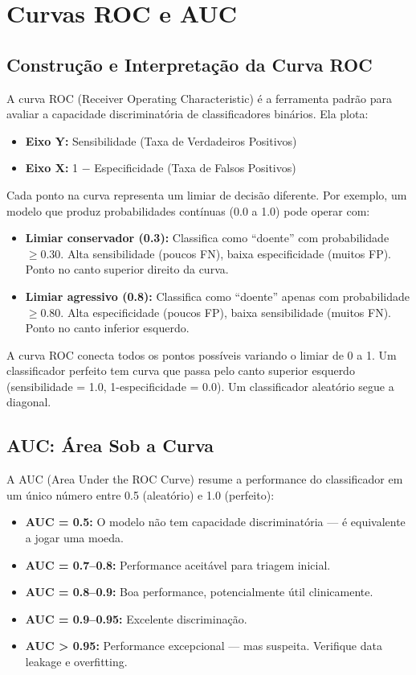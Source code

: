 \section{Curvas ROC e AUC}

\subsection{Construção e Interpretação da Curva ROC}

A curva ROC (Receiver Operating Characteristic)  é a ferramenta padrão para avaliar a capacidade discriminatória de classificadores binários. Ela plota:

\begin{itemize}
    \item \textbf{Eixo Y:} Sensibilidade (Taxa de Verdadeiros Positivos)
    \item \textbf{Eixo X:} 1 $-$ Especificidade (Taxa de Falsos Positivos)
\end{itemize}

Cada ponto na curva representa um limiar de decisão diferente. Por exemplo, um modelo que produz probabilidades contínuas (0.0 a 1.0) pode operar com:
\begin{itemize}
    \item \textbf{Limiar conservador (0.3):} Classifica como ``doente'' com probabilidade $\geq 0.30$. Alta sensibilidade (poucos FN), baixa especificidade (muitos FP). Ponto no canto superior direito da curva.
    \item \textbf{Limiar agressivo (0.8):} Classifica como ``doente'' apenas com probabilidade $\geq 0.80$. Alta especificidade (poucos FP), baixa sensibilidade (muitos FN). Ponto no canto inferior esquerdo.
\end{itemize}

A curva ROC conecta todos os pontos possíveis variando o limiar de 0 a 1. Um classificador perfeito tem curva que passa pelo canto superior esquerdo (sensibilidade = 1.0, 1-especificidade = 0.0). Um classificador aleatório segue a diagonal.

\subsection{AUC: Área Sob a Curva}

A AUC (Area Under the ROC Curve)  resume a performance do classificador em um único número entre 0.5 (aleatório) e 1.0 (perfeito):

\begin{itemize}
    \item \textbf{AUC = 0.5:} O modelo não tem capacidade discriminatória — é equivalente a jogar uma moeda.
    \item \textbf{AUC = 0.7--0.8:} Performance aceitável para triagem inicial.
    \item \textbf{AUC = 0.8--0.9:} Boa performance, potencialmente útil clinicamente.
    \item \textbf{AUC = 0.9--0.95:} Excelente discriminação.
    \item \textbf{AUC > 0.95:} Performance excepcional — mas suspeita. Verifique data leakage e overfitting.
\end{itemize}

